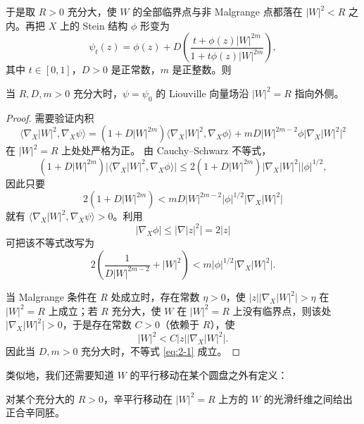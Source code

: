 于是取 $R>0$ 充分大，使 $W$ 的全部临界点与非 Malgrange 点都落在 $|W|^2<R$ 之内。再把 $X$ 上的 Stein 结构 $\phi$ 形变为
\[
\psi_t(z)=\phi(z)+D\left(\frac{t+\phi(z)|W|^{2m}}{1+t\phi(z)|W|^{2m}}\right),
\]
其中 $t\in[0,1]$，$D>0$ 是正常数，$m$ 是正整数。则

\begin{lemma}\label{lem:psi-outward}\label{lem:2-1-3}
当 $R,D,m>0$ 充分大时，$\psi=\psi_0$ 的 Liouville 向量场沿 $|W|^2=R$ 指向外侧。
\end{lemma}

\begin{proof}
需要验证内积
\[
\langle\nabla_X|W|^2,\nabla_X\psi\rangle
=(1+D|W|^{2m})\langle\nabla_X|W|^2,\nabla_X\phi\rangle
+mD|W|^{2m-2}\phi\bigl|\nabla_X|W|^2\bigr|^2
\]
在 $|W|^2=R$ 上处处严格为正。
由 Cauchy--Schwarz 不等式，
\[
(1+D|W|^{2m})\bigl|\langle\nabla_X|W|^2,\nabla_X\phi\rangle\bigr|
\le 2(1+D|W|^{2m})\bigl|\nabla_X|W|^2\bigr||\phi|^{1/2},
\]
因此只要
\[
2(1+D|W|^{2m})<mD|W|^{2m-2}|\phi|^{1/2}\bigl|\nabla_X|W|^2\bigr|
\]
就有 $\langle\nabla_X|W|^2,\nabla_X\psi\rangle>0$。利用
\[
|\nabla_X\phi|\le\bigl|\nabla|z|^2\bigr|=2|z|
\]
可把该不等式改写为
\begin{equation}\label{eq:2-1}
2\left(\frac{1}{D|W|^{2m-2}}+|W|^2\right)
<m|\phi|^{1/2}\bigl|\nabla_X|W|^2\bigr|.
\end{equation}

当 Malgrange 条件在 $R$ 处成立时，存在常数 $\eta>0$，使 $|z|\bigl|\nabla_X|W|^2\bigr|>\eta$ 在 $|W|^2=R$ 上成立；若 $R$ 充分大，使 $W$ 在 $|W|^2=R$ 上没有临界点，则该处 $\bigl|\nabla_X|W|^2\bigr|>0$，于是存在常数 $C>0$（依赖于 $R$），使
\[
|W|^2<C|z|\bigl|\nabla_X|W|^2\bigr|.
\]
因此当 $D,m>0$ 充分大时，不等式 \eqref{eq:2-1} 成立。
\end{proof}

类似地，我们还需要知道 $W$ 的平行移动在某个圆盘之外有定义：

\begin{lemma}\label{lem:parallel-transport}\label{lem:2-1-4}
对某个充分大的 $R>0$，辛平行移动在 $|W|^2=R$ 上方的 $W$ 的光滑纤维之间给出正合辛同胚。
\end{lemma}

